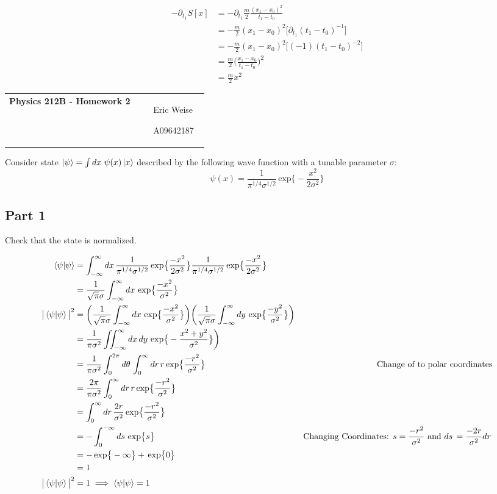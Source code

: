 \documentclass{article}
\newcommand{\assignment}[1]{
    \newpage
    \begin{tabular}{p{0.65\linewidth}p{0.25\linewidth}}
        {\bf\LARGE Physics 212B - Homework #1 }
        &
        \parbox[b]{0.24\textwidth}{
            \hfill Eric Weise

            \hfill A09642187
            }
    \end{tabular}
    \vspace{12pt}
    \newline
}
\newcommand{\D}[1]{{d#1 \,}}
\renewcommand{\exp}[1]{\,\text{exp} \big\{ #1 \big\} }
\begin{document}
\begin{align*}
    -\partial_{t_1} S[x]
    &= -\partial_{t_1} \frac{m}{2} \frac{(x_1 - x_0)^2}{t_1 - t_0} \\
    &= - \frac{m}{2} (x_1 - x_0)^2 \big[ \partial_{t_1} (t_1 - t_0)^{-1} \big] \\
    &= - \frac{m}{2} (x_1 - x_0)^2 \big[ (-1) (t_1 - t_0)^{-2} \big] \\
    &= \frac{m}{2} \big(\frac{x_1 - x_0}{t_1 - t_0}\big)^2 \\
    &= \frac{m}{2} \ddot{x}^2
\end{align*}



\assignment{2}

Consider state
\( \ket{\psi} = \int \D{x} \, \psi(x) \ket{x} \)
described by the following wave function with a tunable parameter $\sigma$:
\[ \psi(x) = \frac{1}{\pi^{1/4} \sigma^{1/2}} \exp{ -\frac{x^2}{2\sigma^2} } \]

\subsection*{Part 1}
Check that the state is normalized.

\begin{align*}
    \braket{\psi|\psi}
    & = \int_{-\infty}^{\infty} \D{x} \frac{1}{\pi^{1/4} \sigma^{1/2}} \exp{ \frac{-x^2}{2\sigma^2} }
        \frac{1}{\pi^{1/4} \sigma^{1/2}} \exp{ \frac{-x^2}{2\sigma^2} } \\
    & = \frac{1}{\sqrt{\pi} \sigma} \int_{-\infty}^{\infty} \D{x} \exp{ \frac{-x^2}{\sigma^2} } \\
    \big| \braket{\psi|\psi} \big| ^2
    & = \bigg( \frac{1}{\sqrt{\pi} \sigma} \int_{-\infty}^{\infty} \D{x} \exp{ \frac{-x^2}{\sigma^2} } \bigg)
        \bigg( \frac{1}{\sqrt{\pi} \sigma} \int_{-\infty}^{\infty} \D{y} \exp{ \frac{-y^2}{\sigma^2} } \bigg) \\
    & = \frac{1}{\pi\sigma^2} \iint_{-\infty}^{\infty} \D{x} \D{y} \exp{ -\frac{x^2 + y^2}{\sigma^2} } \bigg) \\
    & = \frac{1}{\pi\sigma^2} \int_{0}^{2\pi}\D{\theta} \int_{0}^{\infty} \D{r} r \exp{ \frac{-r^2}{\sigma^2} }
        & \text{Change of to polar coordinates}\\
    & = \frac{2\pi}{\pi\sigma^2} \int_{0}^{\infty} \D{r} r \exp{ \frac{-r^2}{\sigma^2} } \\
    & = \int_{0}^{\infty} \D{r} \frac{2r}{\sigma^2} \exp{ \frac{-r^2}{\sigma^2} } \\
    & = -\int_{0}^{-\infty} \D{s} \exp{s}
        & \text{Changing Coordinates: \( s=\frac{-r^2}{\sigma^2} \) and \( \D{s} = \frac{-2r}{\sigma^2} \D{r} \)} \\
    & = -\exp{-\infty} + \exp{0} \\
    & = 1 \\
    \big| \braket{\psi|\psi} \big| ^2 &= 1 \implies \braket{\psi|\psi} = 1
\end{align*}
\end{document}
